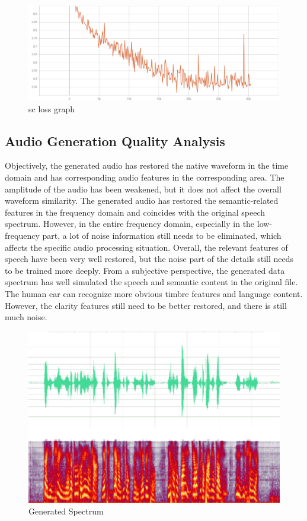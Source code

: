 \documentclass[10pt,journal,compsoc]{IEEEtran}
\begin{document}
\begin{figure}
    \centering
    \includegraphics[scale=0.55] {PNG/4-7.png}
    \caption{sc loss graph}
    \label{fig:4-7}
\end{figure}

\subsection{Audio Generation Quality Analysis}

Objectively, the generated audio has restored the native waveform in the time domain and has corresponding audio features in the corresponding area. The amplitude of the audio has been weakened, but it does not affect the overall waveform similarity. The generated audio has restored the semantic-related features in the frequency domain and coincides with the original speech spectrum. However, in the entire frequency domain, especially in the low-frequency part, a lot of noise information still needs to be eliminated, which affects the specific audio processing situation. Overall, the relevant features of speech have been very well restored, but the noise part of the details still needs to be trained more deeply. From a subjective perspective, the generated data spectrum has well simulated the speech and semantic content in the original file. The human ear can recognize more obvious timbre features and language content. However, the clarity features still need to be better restored, and there is still much noise.

\begin{figure}
    \centering
    \includegraphics[scale=0.6] {PNG/4-8.png}
    \caption{Generated Spectrum}
    \label{fig:4-8}
\end{figure}
\end{document}
